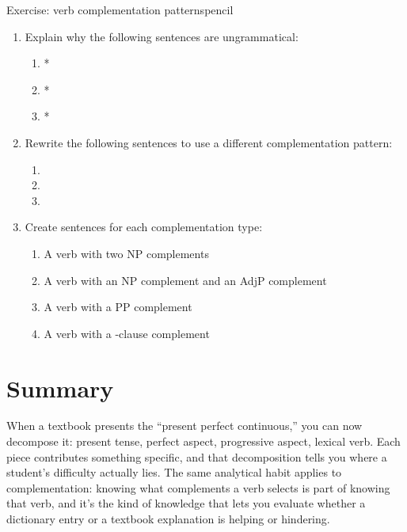 \begin{tblsframedsymbol}{Exercise: verb complementation patterns}{pencil}

\begin{enumerate}[nosep, leftmargin=*]
\item Explain why the following sentences are ungrammatical:

   \begin{enumerate}[nosep]
   \item *
   \item *
   \item *
   \end{enumerate}

\item Rewrite the following sentences to use a different complementation pattern:

   \begin{enumerate}[nosep]
   \item {}
   \item {}
   \item {}
   \end{enumerate}

\item Create sentences for each complementation type:

   \begin{enumerate}[nosep]
   \item A verb with two NP complements
   \item A verb with an NP complement and an AdjP complement
   \item A verb with a PP complement
   \item A verb with a -clause complement
   \end{enumerate}

\end{enumerate}
\end{tblsframedsymbol}


\section{Summary}

When a textbook presents the ``present perfect continuous,'' you can now decompose it: present tense, perfect aspect, progressive aspect, lexical verb. Each piece contributes something specific, and that decomposition tells you where a student's difficulty actually lies. The same analytical habit applies to complementation: knowing what complements a verb selects is part of knowing that verb, and it's the kind of knowledge that lets you evaluate whether a dictionary entry or a textbook explanation is helping or hindering.
